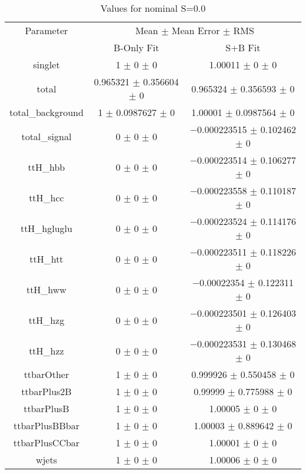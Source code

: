 \begin{table}
\centering
\caption{Values for nominal S=0.0}
\begin{tabular}{ccc}
\toprule
Parameter & \multicolumn{2}{c}{Mean $\pm$ Mean Error $\pm$ RMS}\\
 & B-Only Fit & S+B Fit\\
\midrule
singlet & \num{1} $\pm$ \num{0} $\pm$ \num{0} & \num{1.00011} $\pm$ \num{0} $\pm$ \num{0}\\
total & \num{0.965321} $\pm$ \num{0.356604} $\pm$ \num{0} & \num{0.965324} $\pm$ \num{0.356593} $\pm$ \num{0}\\
total\_background & \num{1} $\pm$ \num{0.0987627} $\pm$ \num{0} & \num{1.00001} $\pm$ \num{0.0987564} $\pm$ \num{0}\\
total\_signal & \num{0} $\pm$ \num{0} $\pm$ \num{0} & \num{-0.000223515} $\pm$ \num{0.102462} $\pm$ \num{0}\\
ttH\_hbb & \num{0} $\pm$ \num{0} $\pm$ \num{0} & \num{-0.000223514} $\pm$ \num{0.106277} $\pm$ \num{0}\\
ttH\_hcc & \num{0} $\pm$ \num{0} $\pm$ \num{0} & \num{-0.000223558} $\pm$ \num{0.110187} $\pm$ \num{0}\\
ttH\_hgluglu & \num{0} $\pm$ \num{0} $\pm$ \num{0} & \num{-0.000223524} $\pm$ \num{0.114176} $\pm$ \num{0}\\
ttH\_htt & \num{0} $\pm$ \num{0} $\pm$ \num{0} & \num{-0.000223511} $\pm$ \num{0.118226} $\pm$ \num{0}\\
ttH\_hww & \num{0} $\pm$ \num{0} $\pm$ \num{0} & \num{-0.00022354} $\pm$ \num{0.122311} $\pm$ \num{0}\\
ttH\_hzg & \num{0} $\pm$ \num{0} $\pm$ \num{0} & \num{-0.000223501} $\pm$ \num{0.126403} $\pm$ \num{0}\\
ttH\_hzz & \num{0} $\pm$ \num{0} $\pm$ \num{0} & \num{-0.000223531} $\pm$ \num{0.130468} $\pm$ \num{0}\\
ttbarOther & \num{1} $\pm$ \num{0} $\pm$ \num{0} & \num{0.999926} $\pm$ \num{0.550458} $\pm$ \num{0}\\
ttbarPlus2B & \num{1} $\pm$ \num{0} $\pm$ \num{0} & \num{0.99999} $\pm$ \num{0.775988} $\pm$ \num{0}\\
ttbarPlusB & \num{1} $\pm$ \num{0} $\pm$ \num{0} & \num{1.00005} $\pm$ \num{0} $\pm$ \num{0}\\
ttbarPlusBBbar & \num{1} $\pm$ \num{0} $\pm$ \num{0} & \num{1.00003} $\pm$ \num{0.889642} $\pm$ \num{0}\\
ttbarPlusCCbar & \num{1} $\pm$ \num{0} $\pm$ \num{0} & \num{1.00001} $\pm$ \num{0} $\pm$ \num{0}\\
wjets & \num{1} $\pm$ \num{0} $\pm$ \num{0} & \num{1.00006} $\pm$ \num{0} $\pm$ \num{0}\\
\bottomrule
\end{tabular}
\end{table}